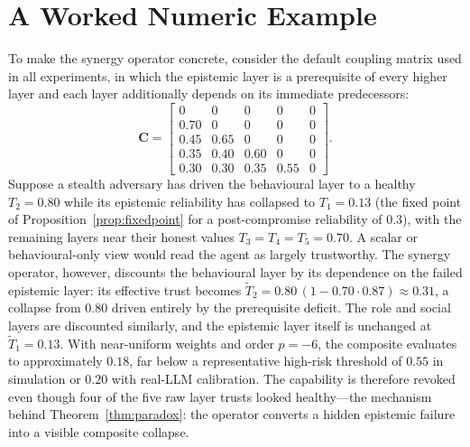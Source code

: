 \documentclass[sigconf,anonymous]{acmart}
\theoremstyle{plain}
\theoremstyle{definition}
\theoremstyle{remark}
\begin{document}
\section{A Worked Numeric Example}
\label{app:worked}
To make the synergy operator concrete, consider the default coupling matrix used in all
experiments, in which the epistemic layer is a prerequisite of every higher layer and
each layer additionally depends on its immediate predecessors:
\begin{equation}
\mathbf{C}=
\begin{bmatrix}
0 & 0 & 0 & 0 & 0\\
0.70 & 0 & 0 & 0 & 0\\
0.45 & 0.65 & 0 & 0 & 0\\
0.35 & 0.40 & 0.60 & 0 & 0\\
0.30 & 0.30 & 0.35 & 0.55 & 0
\end{bmatrix}.
\label{eq:Cdefault}
\end{equation}
Suppose a stealth adversary has driven the behavioural layer to a healthy
$T_2=0.80$ while its epistemic reliability has collapsed to $T_1=0.13$ (the fixed point
of Proposition~\ref{prop:fixedpoint} for a post-compromise reliability of $0.3$), with the
remaining layers near their honest values $T_3=T_4=T_5=0.70$. A scalar or
behavioural-only view would read the agent as largely trustworthy. The synergy operator,
however, discounts the behavioural layer by its dependence on the failed epistemic layer:
its effective trust becomes $\tilde T_2 = 0.80\,(1-0.70\cdot0.87)\approx0.31$, a
collapse from $0.80$ driven entirely by the prerequisite deficit. The role and social
layers are discounted similarly, and the epistemic layer itself is unchanged at
$\tilde T_1=0.13$. With near-uniform weights and order $p=-6$, the composite evaluates to
approximately $0.18$, far below a representative high-risk threshold of $0.55$ in
simulation or $0.20$ with real-LLM calibration. The capability is therefore revoked even
though four of the five raw layer trusts looked healthy---the mechanism behind
Theorem~\ref{thm:paradox}: the operator converts a hidden epistemic failure into a visible
composite collapse.
\end{document}
